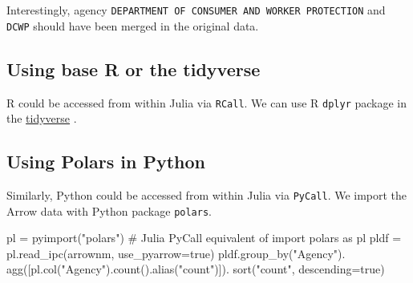 \documentclass[
  12pt]{article}
\newenvironment{Shaded}{\begin{snugshade}}{\end{snugshade}}
\newcommand{\CommentTok}[1]{\textcolor[rgb]{0.37,0.37,0.37}{#1}}
\newcommand{\ConstantTok}[1]{\textcolor[rgb]{0.56,0.35,0.01}{#1}}
\newcommand{\DataTypeTok}[1]{\textcolor[rgb]{0.68,0.00,0.00}{#1}}
\newcommand{\FunctionTok}[1]{\textcolor[rgb]{0.28,0.35,0.67}{#1}}
\newcommand{\NormalTok}[1]{\textcolor[rgb]{0.00,0.23,0.31}{#1}}
\newcommand{\OperatorTok}[1]{\textcolor[rgb]{0.37,0.37,0.37}{#1}}
\newcommand{\StringTok}[1]{\textcolor[rgb]{0.13,0.47,0.30}{#1}}
\begin{document}
Interestingly, agency
\texttt{DEPARTMENT\ OF\ CONSUMER\ AND\ WORKER\ PROTECTION} and
\texttt{DCWP} should have been merged in the original data.

\subsection{Using base R or the
tidyverse}\label{using-base-r-or-the-tidyverse}

R could be accessed from within Julia via \texttt{RCall}. We can use R
\texttt{dplyr} package in the \href{https://tidyverse.org}{tidyverse}
\citep{Wickham2023}.

\begin{Shaded}
\end{Shaded}

\subsection{Using Polars in Python}\label{using-polars-in-python}

Similarly, Python could be accessed from within Julia via
\texttt{PyCall}. We import the Arrow data with Python package
\texttt{polars}.

\begin{Shaded}
\begin{Highlighting}[]
\NormalTok{pl }\OperatorTok{=} \FunctionTok{pyimport}\NormalTok{(}\StringTok{"polars"}\NormalTok{) }\CommentTok{\# Julia PyCall equivalent of \textasciigrave{}import polars as pl\textasciigrave{}}
\NormalTok{pldf }\OperatorTok{=}\NormalTok{ pl.}\FunctionTok{read\_ipc}\NormalTok{(arrownm, use\_pyarrow}\OperatorTok{=}\ConstantTok{true}\NormalTok{)}
\NormalTok{pldf.}\FunctionTok{group\_by}\NormalTok{(}\StringTok{"Agency"}\NormalTok{).}
    \FunctionTok{agg}\NormalTok{([pl.}\FunctionTok{col}\NormalTok{(}\StringTok{"Agency"}\NormalTok{).}\FunctionTok{count}\NormalTok{().}\FunctionTok{alias}\NormalTok{(}\StringTok{"count"}\NormalTok{)]).}
    \FunctionTok{sort}\NormalTok{(}\StringTok{"count"}\NormalTok{, descending}\OperatorTok{=}\ConstantTok{true}\NormalTok{)}
\end{Highlighting}
\end{Shaded}
\end{document}
